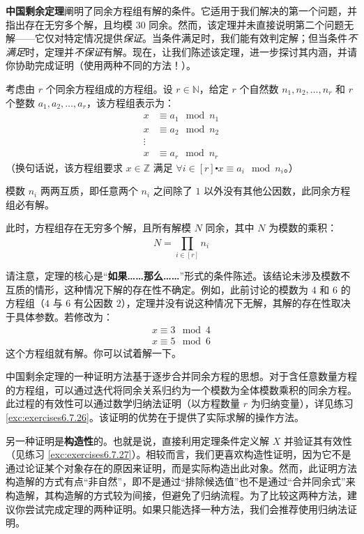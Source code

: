 \textbf{中国剩余定理}阐明了同余方程组有解的条件。它适用于我们解决的第一个问题，并指出存在无穷多个解，且均模 $30$ 同余。然而，该定理并未直接说明第二个问题无解——它仅对特定情况提供\emph{保证}。当条件满足时，我们能有效判定解；但当条件\emph{不满足}时，定理并\emph{不保证}有解。现在，让我们陈述该定理，进一步探讨其内涵，并请你协助完成证明（使用两种不同的方法！）。

\begin{theorem}[中国剩余定理]\label{theorem6.5.28}
    考虑由 $r$ 个同余方程组成的方程组。设 $r \in \mathbb{N}$，给定 $r$ 个自然数 $n_1, n_2, \dots, n_r$ 和 $r$ 个整数 $a_1, a_2, \dots, a_r$，该方程组表示为：
    \begin{align*}
        x &\equiv a_1 \mod n_1 \\
        x &\equiv a_2 \mod n_2 \\
        \vdots \\
        x &\equiv a_r \mod n_r
    \end{align*}
    （换句话说，该方程组要求 $x \in \mathbb{Z}$ 满足 $\forall i \in [r] \centerdot x \equiv a_i \mod n_i$。）

    模数 $n_i$ 两两互质，即任意两个 $n_i$ 之间除了 $1$ 以外没有其他公因数，此同余方程组必有解。

    此时，方程组存在无穷多个解，且所有解模 $N$ 同余，其中 $N$ 为模数的乘积：
    \[N = \prod_{i \in [r]}^{} n_i\]
\end{theorem}

请注意，定理的核心是``\textbf{如果……那么……}''形式的条件陈述。该结论未涉及模数不互质的情形，这种情况下解的存在性不确定。例如，此前讨论的模数为 $4$ 和 $6$ 的方程组（$4$ 与 $6$ 有公因数 $2$），定理并没有说这种情况下无解，其解的存在性取决于具体参数。若修改为：
\begin{align*}
    x \equiv 3 \mod 4 \\
    x \equiv 5 \mod 6
\end{align*}
这个方程组就有解。你可以试着解一下。

中国剩余定理的一种证明方法基于逐步合并同余方程的思想。对于含任意数量方程的方程组，可以通过迭代将同余关系归约为一个模数为全体模数乘积的同余方程。此过程的有效性可以通过数学归纳法证明（以方程数量 $r$ 为归纳变量），详见练习 \ref{exc:exercises6.7.26}。该证明的优势在于提供了实际求解的操作方法。

另一种证明是\textbf{构造性}的。也就是说，直接利用定理条件定义解 $X$ 并验证其有效性（见练习 \ref{exc:exercises6.7.27}）。相较而言，我们更喜欢构造性证明，因为它不是通过论证某个对象存在的原因来证明，而是实际构造出此对象。然而，此证明方法构造解的方式有点``非自然''，即不是通过``排除候选值''也不是通过``合并同余式''来构造解，其构造解的方式较为间接，但避免了归纳流程。为了比较这两种方法，建议你尝试完成定理的两种证明。如果只能选择一种方法，我们会推荐使用归纳法证明。

